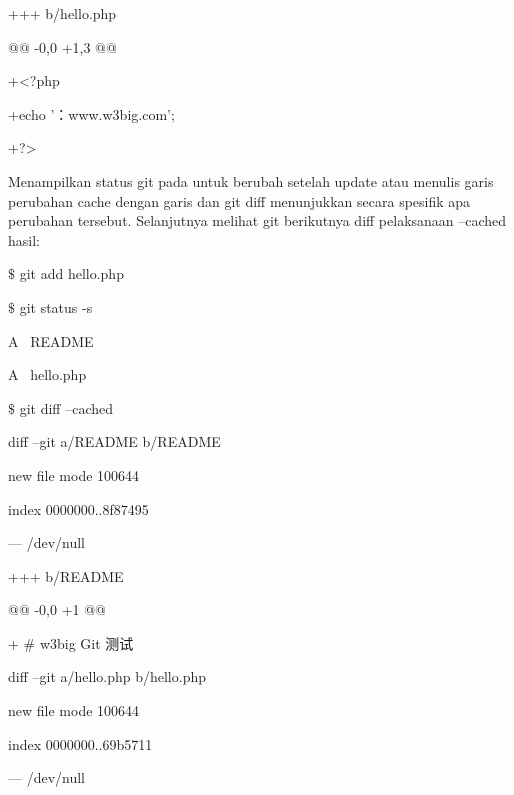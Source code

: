\noindent 
{\fontsize{10pt}{10pt}\selectfont +++ b/hello.php} \par
\noindent 
{\fontsize{10pt}{10pt}\selectfont @@ -0,0 +1,3 @@} \par
\noindent 
{\fontsize{10pt}{10pt}\selectfont +<?php} \par
\noindent 
{\fontsize{10pt}{10pt}\selectfont +echo '：www.w3big.com';} \par
\noindent 
{\fontsize{10pt}{10pt}\selectfont +?>} \par
\noindent 
\vspace{10pt}
Menampilkan status git pada untuk berubah setelah update atau menulis garis perubahan cache dengan garis dan git diff menunjukkan secara spesifik apa perubahan tersebut.  Selanjutnya melihat git berikutnya diff pelaksanaan --cached hasil:  \par
\noindent 
{\fontsize{10pt}{10pt}\selectfont  $  \$  $ git add hello.php } \par
\noindent 
{\fontsize{10pt}{10pt}\selectfont  $  \$  $ git status -s} \par
\noindent 
{\fontsize{10pt}{10pt}\selectfont A~ README} \par
\noindent 
{\fontsize{10pt}{10pt}\selectfont A~ hello.php} \par
\noindent 
{\fontsize{10pt}{10pt}\selectfont  $  \$  $ git diff --cached} \par
\noindent 
{\fontsize{10pt}{10pt}\selectfont diff --git a/README b/README} \par
\noindent 
{\fontsize{10pt}{10pt}\selectfont new file mode 100644} \par
\noindent 
{\fontsize{10pt}{10pt}\selectfont index 0000000..8f87495} \par
\noindent 
{\fontsize{10pt}{10pt}\selectfont --- /dev/null} \par
\noindent 
{\fontsize{10pt}{10pt}\selectfont +++ b/README} \par
\noindent 
{\fontsize{10pt}{10pt}\selectfont @@ -0,0 +1 @@} \par
\noindent 
{\fontsize{10pt}{10pt}\selectfont + $  \#  $ w3big Git 测试} \par
\noindent 
{\fontsize{10pt}{10pt}\selectfont diff --git a/hello.php b/hello.php} \par
\noindent 
{\fontsize{10pt}{10pt}\selectfont new file mode 100644} \par
\noindent 
{\fontsize{10pt}{10pt}\selectfont index 0000000..69b5711} \par
\noindent 
{\fontsize{10pt}{10pt}\selectfont --- /dev/null} \par
